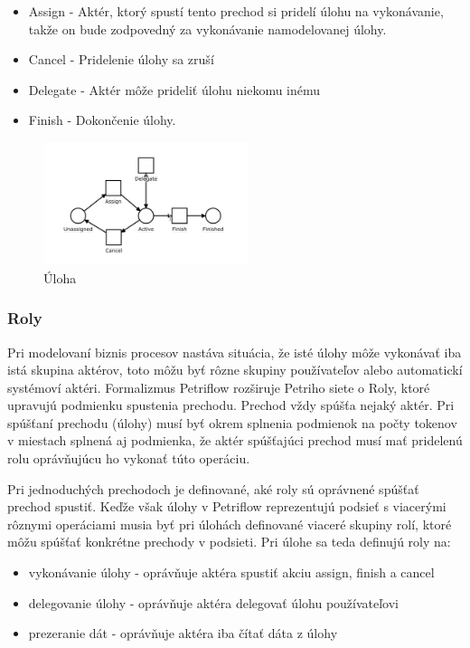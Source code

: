 \begin{itemize}
\item Assign - Aktér, ktorý spustí tento prechod si pridelí úlohu na vykonávanie, takže on bude zodpovedný za vykonávanie namodelovanej úlohy.
\item Cancel - Pridelenie úlohy sa zruší
\item Delegate - Aktér môže prideliť úlohu niekomu inému
\item Finish - Dokončenie úlohy. 
\end{itemize}


\begin{figure}[!htbp]
\centering
\includegraphics[width=6cm]{img/pn_task.png}
\caption{Úloha}
\label{pn_task}
\end{figure}


\subsubsection{Roly}
Pri modelovaní biznis procesov nastáva situácia, že isté úlohy môže vykonávať iba istá skupina aktérov, toto môžu byť rôzne skupiny používateľov alebo automatickí systémoví aktéri.  Formalizmus Petriflow rozširuje Petriho siete o Roly, ktoré upravujú podmienku spustenia prechodu. Prechod vždy spúšťa nejaký aktér. Pri spúšťaní prechodu (úlohy) musí byť okrem splnenia podmienok na počty tokenov v miestach splnená aj podmienka, že aktér spúšťajúci prechod musí mať pridelenú rolu oprávňujúcu  ho vykonať túto operáciu. 

Pri jednoduchých prechodoch je definované, aké roly sú oprávnené spúšťať prechod spustiť. Keďže však úlohy v Petriflow reprezentujú podsieť s viacerými rôznymi operáciami musia byť pri úlohách definované viaceré skupiny rolí, ktoré môžu spúšťať konkrétne prechody v podsieti. Pri úlohe sa teda definujú roly na:
\begin{itemize}
\item vykonávanie úlohy - oprávňuje aktéra spustiť akciu assign, finish a cancel
\item delegovanie úlohy - oprávňuje aktéra delegovať úlohu používateľovi
\item prezeranie dát - oprávňuje aktéra  iba čítať dáta z úlohy
\end{itemize}

